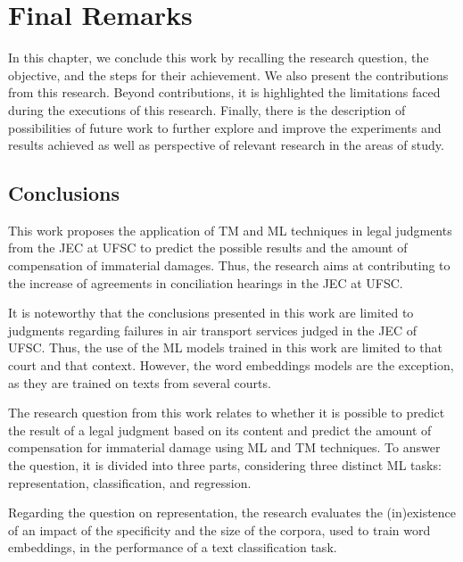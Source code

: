 \chapter{Final Remarks} \label{cap:final_remarks}

In this chapter, we conclude this work by recalling the research question, the objective, and the steps for their achievement. We also present the contributions from this research. Beyond contributions, it is highlighted the limitations faced during the executions of this research. Finally, there is the description of possibilities of future work to further explore and improve the experiments and results achieved as well as perspective of relevant research in the areas of study.

\section{Conclusions}


This work proposes the application of \gls{TM} and \gls{ML} techniques in legal judgments from the  \gls{JEC} at \gls{UFSC} to predict the possible results and the amount of compensation of immaterial damages. Thus, the research aims at contributing to the increase of agreements in conciliation hearings in the \gls{JEC} at \gls{UFSC}.

It is noteworthy that the conclusions presented in this work  are limited to judgments regarding failures in air transport services judged in the \gls{JEC} of \gls{UFSC}. Thus, the use of the \gls{ML} models trained in this work are limited to that court and that context. However, the word embeddings models are the exception, as they are trained on texts from several courts.

The research question from this work relates to whether it is possible to predict the result of a legal judgment based on its content and predict the amount of compensation for immaterial damage using \gls{ML} and \gls{TM} techniques. To answer the question, it is  divided into three parts, considering three distinct \gls{ML}  tasks: representation, classification, and regression.



Regarding the question on representation, the research evaluates the (in)existence of an impact of the specificity and the size of the corpora, used to train word embeddings,  in the performance of a text classification task. 

